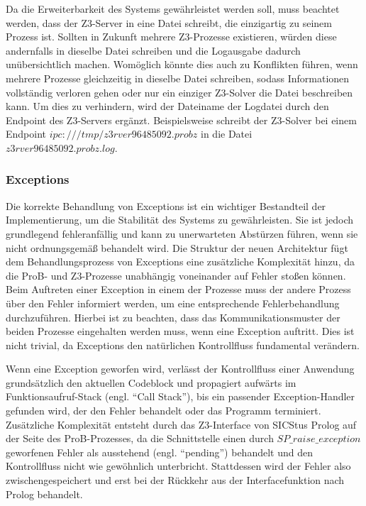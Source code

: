 Da die Erweiterbarkeit des Systems gewährleistet werden soll, muss beachtet werden, dass der Z3-Server in eine Datei schreibt, die einzigartig zu seinem Prozess ist.
Sollten in Zukunft mehrere Z3-Prozesse existieren, würden diese andernfalls in dieselbe Datei schreiben und die Logausgabe dadurch unübersichtlich machen.
Womöglich könnte dies auch zu Konflikten führen, wenn mehrere Prozesse gleichzeitig in dieselbe Datei schreiben, sodass Informationen vollständig verloren gehen oder nur ein einziger Z3-Solver die Datei beschreiben kann.
Um dies zu verhindern, wird der Dateiname der Logdatei durch den Endpoint des Z3-Servers ergänzt.
Beispielsweise schreibt der Z3-Solver bei einem Endpoint $ipc:///tmp/z3rver96485092.probz$ in die Datei $z3rver96485092.probz.log$.

\subsubsection{Exceptions}
\label{subsec:exceptions}

Die korrekte Behandlung von Exceptions ist ein wichtiger Bestandteil der Implementierung, um die Stabilität des Systems zu gewährleisten.
Sie ist jedoch grundlegend fehleranfällig und kann zu unerwarteten Abstürzen führen, wenn sie nicht ordnungsgemäß behandelt wird.
Die Struktur der neuen Architektur fügt dem Behandlungsprozess von Exceptions eine zusätzliche Komplexität hinzu, da die ProB- und Z3-Prozesse unabhängig voneinander auf Fehler stoßen können.
Beim Auftreten einer Exception in einem der Prozesse muss der andere Prozess über den Fehler informiert werden, um eine entsprechende Fehlerbehandlung durchzuführen.
Hierbei ist zu beachten, dass das Kommunikationsmuster der beiden Prozesse eingehalten werden muss, wenn eine Exception auftritt.
Dies ist nicht trivial, da Exceptions den natürlichen Kontrollfluss fundamental verändern.

Wenn eine Exception geworfen wird, verlässt der Kontrollfluss einer Anwendung grundsätzlich den aktuellen Codeblock und propagiert aufwärts im Funktionsaufruf-Stack (engl. \enquote{Call Stack}),
bis ein passender Exception-Handler gefunden wird, der den Fehler behandelt oder das Programm terminiert. 
Zusätzliche Komplexität entsteht durch das Z3-Interface von SICStus Prolog auf der Seite des ProB-Prozesses,
da die Schnittstelle einen durch $SP\_raise\_exception$ geworfenen Fehler als ausstehend (engl. \enquote{pending}) behandelt und den Kontrollfluss nicht wie gewöhnlich unterbricht.
Stattdessen wird der Fehler also zwischengespeichert und erst bei der Rückkehr aus der Interfacefunktion nach Prolog behandelt.

